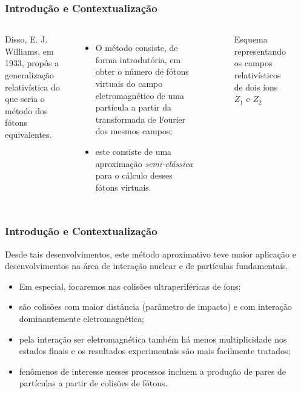 \documentclass[xcolor=dvipsnames]{beamer}
\begin{document}
\begin{frame}
	\frametitle{Introdução e Contextualização}

	\begin{columns}

	Disso, E. J. Williams, em 1933, propôs a generalização relativística do que
	seria o método dos fótons equivalentes.
	\begin{itemize}
		\item O método consiste, de forma introdutória, em obter o número de 
			fótons virtuais do campo eletromagnético de uma partícula a
			partir da transformada de Fourier dos mesmos campos;
		\item este consiste de uma aproximação \textit{semi-clássica} para
			o cálculo desses fótons virtuais.
	\end{itemize}


	\begin{figure}
		
		\caption{Esquema representando os campos relativísticos de dois íons
		$Z_1$ e $Z_2$}
	\end{figure}


	\end{columns}
\end{frame}

\begin{frame}
	\frametitle{Introdução e Contextualização}

	Desde tais desenvolvimentos, este método aproximativo teve maior aplicação e
	desenvolvimentos na área de interação nuclear e de partículas fundamentais.

	\begin{itemize}
		\item Em especial, focaremos nas colisões ultraperiféricas de íons;
		\item são colisões com maior distância (parâmetro de impacto) e com
			interação dominantemente eletromagnética;
		\item pela interação ser eletromagnética também há menos multiplicidade
			nos estados finais e os resultados experimentais são mais facilmente
			tratados;
		\item fenômenos de interesse nesses processos incluem a produção de
			pares de partículas a partir de colisões de fótons.
	\end{itemize}
\end{frame}
\end{document}
